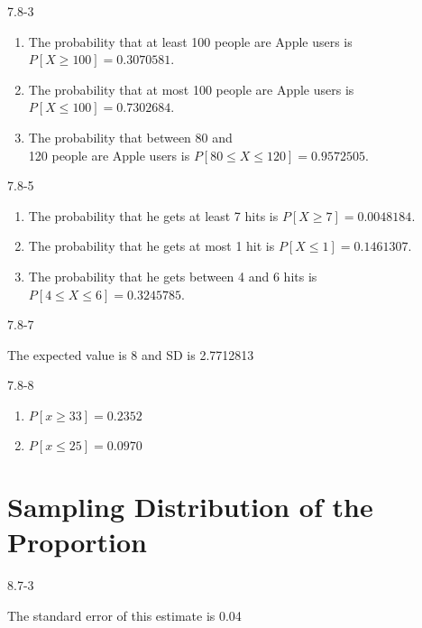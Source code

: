 \begin{exsol@solution}{7.8-3}

\begin{enumerate}
\item The probability that at least 100 people are Apple users is $P[X \ge 100] = 0.3070581$.
\item The probability that at most 100 people are Apple users is $P[X \le 100] = 0.7302684$.
\item The probability that between 80 and \\ 120 people are Apple users is $P[ 80 \le X \le 120] = 0.9572505$.
\end{enumerate}
\end{exsol@solution}
\begin{exsol@solution}{7.8-5}

\begin{enumerate}
\item The probability that he gets at least 7 hits is $P[X \ge 7] = 0.0048184$.
\item The probability that he gets at most 1 hit is $P[X \le 1] = 0.1461307$.
\item The probability that he gets between 4 and 6 hits is $P[4 \le X \le 6] = 0.3245785$.
\end{enumerate}

\end{exsol@solution}
\begin{exsol@solution}{7.8-7}

The expected value is 8 and SD is 2.7712813
\end{exsol@solution}
\begin{exsol@solution}{7.8-8}



\begin{enumerate}
\item $P[ x \ge 33] = 0.2352$
\item $P[ x \le 25] = 0.0970$
\end{enumerate}

\end{exsol@solution}
\setcounter{chapter}{7}\chapter{Sampling Distribution of the Proportion}
\begin{exsol@solution}{8.7-3}

The standard error of this estimate is 0.04

\end{exsol@solution}
